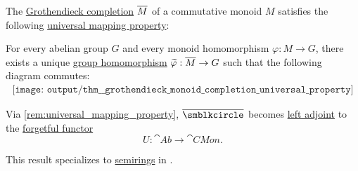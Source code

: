 \begin{theorem}\label{thm:grothendieck_monoid_completion_universal_property}
  The \hyperref[def:monoid_grothendieck_completion]{Grothendieck completion} \( \oline{M} \) of a commutative monoid \( M \) satisfies the following \hyperref[rem:universal_mapping_property]{universal mapping property}:
  \begin{displayquote}
    For every abelian group \( G \) and every monoid homomorphism \( \varphi: M \to G \), there exists a unique \hyperref[def:group/homomorphism]{group homomorphism} \( \widetilde{\varphi}: \oline{M} \to G \) such that the following diagram commutes:
    \begin{equation}\label{eq:thm:grothendieck_monoid_completion_universal_property/diagram}
      \begin{aligned}
        \texttt{[image: output/thm\_\_grothendieck\_monoid\_completion\_universal\_property]}
      \end{aligned}
    \end{equation}
  \end{displayquote}
\end{theorem}
\begin{comments}
  \item Via \cref{rem:universal_mapping_property}, \( \oline{\anon} \) becomes \hyperref[def:category_adjunction]{left adjoint} to the \hyperref[def:concrete_category]{forgetful functor}
  \begin{equation*}
    U: \cat{Ab} \to \cat{CMon}.
  \end{equation*}

  \item This result specializes to \hyperref[def:semiring]{semirings} in .
\end{comments}
